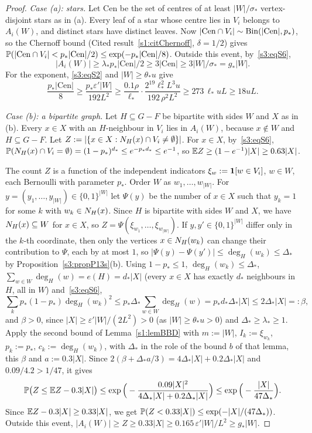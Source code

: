 \begin{proof}
\emph{Case (a): stars.} Let $\mathrm{Cen}$ be the set of centres of at
least $|W|/\sigma_*$ vertex-disjoint stars as in (a). Every leaf of a
star whose centre lies in $V_i$ belongs to $A_i(W)$, and distinct stars
have distinct leaves. Now $|\mathrm{Cen}\cap V_i|\sim\mathrm{Bin}(|\mathrm{Cen}|,p_*)$,
so the Chernoff bound (Cited result~\ref{s1:citChernoff}, $\delta=1/2$) gives
$\mathbb{P}(|\mathrm{Cen}\cap V_i|<p_*|\mathrm{Cen}|/2)\le\exp(-p_*|\mathrm{Cen}|/8)$.
Outside this event, by~\ref{s3:eqS6},
\[
|A_i(W)|\ge\lambda_*p_*|\mathrm{Cen}|/2\ge3|\mathrm{Cen}|\ge3|W|/\sigma_*=g_*|W|.
\]
For the exponent, \ref{s3:eqS2} and $|W|\ge\theta_*u$ give
\[
\frac{p_*|\mathrm{Cen}|}{8}\ge\frac{p_*\varepsilon'|W|}{192L^2}\ge\frac{0.1\rho}{\ell_*}\cdot\frac{2^{19}\ell_*^2L^3u}{192\,\rho^2L^2}\ge 273\,\ell_*uL\ge 18uL.
\]

\emph{Case (b): a bipartite graph.} Let $H\subseteq G-F$ be bipartite
with sides $W$ and $X$ as in (b). Every $x\in X$ with an $H$-neighbour in
$V_i$ lies in $A_i(W)$, because $x\notin W$ and $H\subseteq G-F$. Let
$Z:=|\{x\in X:N_H(x)\cap V_i\ne\emptyset\}|$. For $x\in X$,
by~\ref{s3:eqS6},
$\mathbb{P}(N_H(x)\cap V_i=\emptyset)=(1-p_*)^{d_*}\le e^{-p_*d_*}\le e^{-1}$,
so $\mathbb{E} Z\ge(1-e^{-1})|X|\ge0.63|X|$.

The count $Z$ is a function of the independent indicators
$\xi_w:=\mathbf{1}[w\in V_i]$, $w\in W$, each Bernoulli with parameter $p_*$.
Order $W$ as $w_1,\dots,w_{|W|}$. For $y=(y_1,\dots,y_{|W|})\in\{0,1\}^{|W|}$
let $\Psi(y)$ be the number of $x\in X$ such that $y_k=1$ for some $k$ with
$w_k\in N_H(x)$. Since $H$ is bipartite with sides $W$ and $X$, we have
$N_H(x)\subseteq W$ for $x\in X$, so
$Z=\Psi(\xi_{w_1},\dots,\xi_{w_{|W|}})$. If $y,y'\in\{0,1\}^{|W|}$ differ
only in the $k$-th coordinate, then only the vertices $x\in N_H(w_k)$ can
change their contribution to $\Psi$, each by at most $1$, so
$|\Psi(y)-\Psi(y')|\le\deg_H(w_k)\le\Delta_*$ by
Proposition~\ref{s3:propP13s}(b). Using $1-p_*\le1$,
$\deg_H(w_k)\le\Delta_*$, $\sum_{w\in W}\deg_H(w)=e(H)=d_*|X|$ (every
$x\in X$ has exactly $d_*$ neighbours in $H$, all in $W$) and~\ref{s3:eqS6},
\[
\sum_k p_*(1-p_*)\deg_H(w_k)^2\le p_*\Delta_*\sum_{w\in W}\deg_H(w)=p_*d_*\Delta_*|X|\le 2\Delta_*|X|=:\beta ,
\]
and $\beta>0$, since $|X|\ge\varepsilon'|W|/(2L^2)>0$ (as $|W|\ge\theta_*u>0$)
and $\Delta_*\ge\lambda_*\ge1$.
Apply the second bound of Lemma~\ref{s1:lemBBD} with $m:=|W|$,
$I_k:=\xi_{w_k}$, $p_k:=p_*$, $c_k:=\deg_H(w_k)$, with $\Delta_*$ in the role
of the bound $b$ of that lemma, this $\beta$ and $a:=0.3|X|$. Since
$2(\beta+\Delta_*a/3)=4\Delta_*|X|+0.2\Delta_*|X|$ and
$0.09/4.2>1/47$, it gives
\[
\mathbb{P}\big(Z\le\mathbb{E} Z-0.3|X|\big)\le\exp\Big(-\frac{0.09|X|^2}{4\Delta_*|X|+0.2\Delta_*|X|}\Big)\le\exp\Big(-\frac{|X|}{47\Delta_*}\Big).
\]
Since $\mathbb{E} Z-0.3|X|\ge0.33|X|$, we get
$\mathbb{P}(Z<0.33|X|)\le\exp(-|X|/(47\Delta_*))$. Outside this event,
$|A_i(W)|\ge Z\ge0.33|X|\ge0.165\,\varepsilon'|W|/L^2\ge g_*|W|$.


\end{proof}
